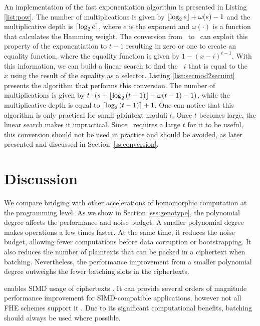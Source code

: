 An implementation of the fast exponentiation algorithm is presented in Listing \ref{list:pow}. The number of multiplications is given by $\lfloor\log_2{e}\rfloor + \omega(e) - 1$ and the multiplicative depth is $\lceil\log_2{e}\rceil$, where $e$ is the exponent and $\omega(\cdot)$ is a function that calculates the Hamming weight. The conversion from \secmod\ to \secuint\ can exploit this property of the exponentiation to $t-1$ resulting in zero or one to create an equality function, where the equality function is given by $1 - (x-i)^{t-1}$. With this information, we can build a linear search to find the \secuint\ $i$ that is equal to the \secmod\ $x$ using the result of the equality as a selector. Listing \ref{list:secmod2secuint} presents the algorithm that performs this conversion.
The number of multiplications is given by $t \cdot (s + \lfloor\log_2{(t-1)}\rfloor + \omega(t-1) - 1)$, while the multiplicative depth is equal to $\lceil\log_2{(t-1)}\rceil + 1$.
One can notice that this algorithm is only practical for small plaintext moduli $t$. Once $t$ becomes large, the linear search makes it impractical. Since \secmod\ requires a large $t$ for it to be useful, this conversion should not be used in practice and should be avoided, as later presented and discussed in Section~\ref{ss:conversion}.



\section{Discussion}\label{s:related_work}

We compare bridging with other accelerations of homomorphic computation at the programming level.
As we show in Section \ref{sss:genotype}, the polynomial degree affects the performance and noise budget. A smaller polynomial degree makes operations a few times faster. At the same time, it reduces the noise budget, allowing fewer computations before data corruption or bootstrapping. It also reduces the number of plaintexts that can be packed in a ciphertext when batching. Nevertheless, the performance improvement from a smaller polynomial degree outweighs the fewer batching slots in the ciphertexts.

 enables SIMD usage of ciphertexts \cite{batching}. It can provide several orders of magnitude performance improvement for SIMD-compatible applications, however not all FHE schemes support it \cite{chillotti2016faster,ducas2015fhew}. Due to its significant computational benefits, batching should always be used where possible. 

